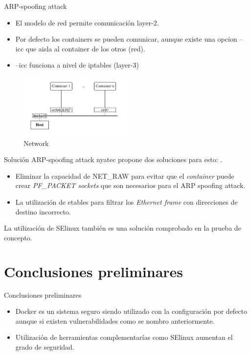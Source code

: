 \documentclass{bredelebeamer}
\newcommand{\container}{\textit{container }}
\begin{document}
\begin{frame}{ARP-spoofing attack}

 \begin{itemize}
 	\item El modelo de red permite comunicación layer-2.
 	\item Por defecto los containers se pueden comunicar, aunque existe una opcion --icc que aisla al container de los otros (red).
 	\item --icc funciona a nivel de iptables (layer-3)
 \end{itemize}
 
 
 	\begin{figure}[H]
  \centering
  \includegraphics[width=0.5\textwidth]{images/network.png}
    \caption{Network}
    \label{fig:dynamic}
\end{figure}	
\end{frame}



\begin{frame}{Solución ARP-spoofing attack}
nyatec propone dos soluciones para esto: \cite{nyantec:2015:Online}.

 \begin{itemize}
 	\item Eliminar la capacidad 
de NET\_RAW para evitar que el \container puede crear \textit{PF\_PACKET sockets} 
que son necesarios para el ARP spoofing attack.
 	\item La utilización de etables para 
filtrar los \textit{Ethernet frame} con direcciones de destino incorrecto.
 \end{itemize}

La utilización de SElinux también es una solución comprobado en la prueba de concepto.
\end{frame}

	  

\section{Conclusiones preliminares}

\begin{frame}{Conclusiones preliminares}

\begin{itemize}
	\item Docker es un sistema seguro siendo utilizado con la configuración por defecto aunque si existen vulnerabilidades como se nombro anteriormente.
	\item Utilización de herramientas complementarías como SElinux aumentan el grado de seguridad.
\end{itemize}
\end{frame}
\end{document}
